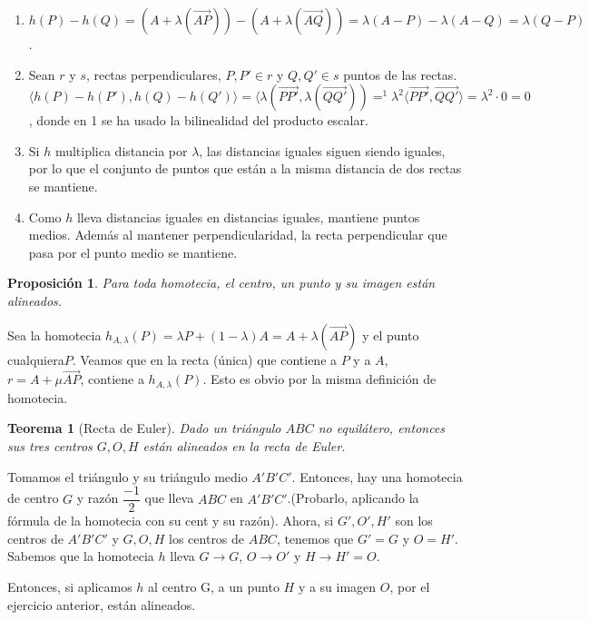 \documentclass[11pt, a4paper]{article}
\makeatletter
\newif\IfInSansMode
\let\oldsf\sffamily
\renewcommand*{\sffamily}{\oldsf\mathversion{sans}\InSansModetrue}
\let\oldnorm\normalfont
\renewcommand*{\normalfont}{\oldnorm\InSansModefalse\mathversion{normal}}
\renewenvironment{proof}[1][\proofname] {\vspace{-15pt}\par\pushQED{\qed}\normalfont\topsep6\p@\@plus6\p@\relax\trivlist\item[\hskip\labelsep\it#1\@addpunct{.}]\ignorespaces}{\popQED\endtrivlist\@endpefalse}
\renewcommand{\vec}{\overrightarrow}
\renewenvironment{proof}[1][\proofname] {\par\pushQED{\qed}\normalfont\topsep6\p@\@plus6\p@\relax\trivlist\item[\hskip\labelsep\itshape\sffamily#1\@addpunct{.}]\ignorespaces}{\popQED\endtrivlist\@endpefalse}
\theoremstyle{theorem-style}
\newtheorem{nth}{Teorema}[section]
\newtheorem{nprop}{Proposición}[section]
\theoremstyle{definition-style}
\theoremstyle{remark-style}
\theoremstyle{example-style}
\makeatother
\begin{document}
\begin{proof}\hfill
\begin{enumerate}
	\item $h(P)-h(Q)=(A+\lambda(\vec{AP})) -(A+\lambda(\vec{AQ})) = \lambda(A-P) - \lambda(A-Q) = \lambda (Q-P)$.
	\item  Sean $r$ y $ s$, rectas perpendiculares, $P,P' \in r$ y $Q,Q'\in s$ puntos de las rectas. $\langle h(P) - h(P'),h(Q) - h(Q')\rangle  =  \langle \lambda (\vec{PP'}, \lambda(\vec {QQ'}))=^1 \lambda^2 \langle \vec{PP'},\vec{QQ'}\rangle  = \lambda^2 \cdot 0 = 0 $, donde en 1 se ha usado la bilinealidad del producto escalar.
	\item Si $h$ multiplica distancia por $\lambda$, las distancias iguales siguen siendo iguales, por lo que el conjunto de puntos que están a la misma distancia de dos rectas se mantiene.
	\item Como $h$ lleva distancias iguales en distancias iguales, mantiene puntos medios. Además al mantener perpendicularidad, la recta perpendicular que pasa por el punto medio se mantiene.
\end{enumerate}
\end{proof}


\begin{nprop}
	
Para toda homotecia, el centro, un punto y su imagen están alineados.
\end{nprop}

\begin{proof}
	Sea la homotecia $h_{A,\lambda}(P) = \lambda P + (1-\lambda)A = A+\lambda(\vec{AP})$ y el punto cualquiera$P$. Veamos que en la recta (única) que contiene a $P$ y a $ A$, $r= A + \mu \vec{AP}$,  contiene a $h_{A,\lambda} (P)$. Esto es obvio por la misma definición de homotecia.	
\end{proof}


\begin{nth}[Recta de Euler]
  Dado un triángulo $ABC$ no equilátero, entonces sus tres centros $G,O,H$ están alineados en la recta de Euler.
\end{nth}
\begin{proof}
  Tomamos el triángulo y su triángulo medio $A'B'C'$. Entonces, hay una homotecia de centro $G$ y razón $\dfrac{-1}{2}$ que lleva $ABC$ en $A'B'C'$.(Probarlo, aplicando la fórmula de la homotecia con su cent y su razón). 
  Ahora, si $G',O',H'$ son los centros de $A'B'C'$ y $G,O,H$ los centros de $ABC$, tenemos que $G'=G$ y $O=H'$. Sabemos que la homotecia $h$ lleva $G \to G$, $O \to O'$ y $H \to H' = O$.
  
  Entonces, si aplicamos $h$ al centro G, a un punto $H$ y a su imagen $O$, por el ejercicio anterior, están alineados.
  
\end{proof}
\end{document}
